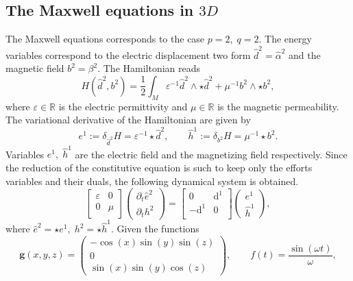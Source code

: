 \documentclass{elsarticle}
\renewcommand\d{\ensuremath{\mathrm{d}}}
\newcommand{\bbR}{\mathbb{R}}
\newcommand*{\dual}[1]{\ensuremath{\widehat{#1}}}
\begin{document}
\subsection{The Maxwell equations in $3D$}
The Maxwell equations corresponds to the case $p=2, \; q=2$. The energy variables correspond to the electric displacement two form $\dual{d}^2 = \dual{\alpha}^2$ and the magnetic field $b^2=\beta^2$. The Hamiltonian reads
\begin{equation}
    H(\dual{d}^2, b^2) = \frac{1}{2} \int_M \varepsilon^{-1} \dual{d}^2 \wedge \star \dual{d}^2 + \mu^{-1} b^2 \wedge \star b^2,
\end{equation}
where $\varepsilon \in \bbR$ is the electric permittivity and $\mu \in \bbR$ is the magnetic permeability. The variational derivative of the Hamiltonian are given by 
\begin{equation}
    e^1 := \delta_{\dual{d}^2} H = \varepsilon^{-1} \star \dual{d}^2, \qquad \dual{h}^1 := \delta_{b^2} H = \mu^{-1} \star b^2.
\end{equation}
Variables $e^1, \; \dual{h}^1$ are the electric field and the magnetizing field respectively. Since the reduction of the constitutive equation is such to keep only the efforts variables and their duals, the following dynamical system is obtained.
\begin{equation}\label{eq:maxwell_eq}
\begin{bmatrix}
\varepsilon & 0 \\
0 & \mu \\
\end{bmatrix}
    \begin{pmatrix}
    \partial_t \dual{e}^2\\
    \partial_t h^2
    \end{pmatrix} = 
    \begin{bmatrix}
    0 & \d^1 \\
    -\d^1 & 0 \\
    \end{bmatrix}
    \begin{pmatrix}
    {e}^1\\
    \dual{h}^1
    \end{pmatrix},
\end{equation}
where $\dual{e}^2 = \star e^1, \; h^2= \star \dual{h}^1$. Given the functions
\begin{equation}
    \bm{g}(x, y, z) = \begin{pmatrix}
    -\cos(x)\sin(y)\sin(z) \\
    0 \\
    \sin(x)\sin(y)\cos(z)
    \end{pmatrix}, \qquad f(t) = \frac{\sin(\omega t)}{\omega},
\end{equation}
\end{document}
